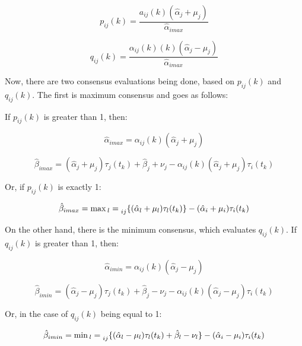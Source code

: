 \documentclass[a4paper,12pt]{article}
\begin{document}
    \begin{equation}
        p_{ij}(k) = \frac{a_{ij}(k)(\hat{\alpha}_j + \mu_j)}{\hat{\alpha}_{imax}}
    \end{equation}
    
    \begin{equation}
        q_{ij}(k) = \frac{\alpha_{ij}(k) (k) (\hat{\alpha}_j - \mu_j)}{\hat{\alpha}_{imax}}
    \end{equation}
    
    Now, there are two consensus evaluations being done, based on $p_{ij}(k)$ and $q_{ij}(k)$. The first is maximum consensus and goes as follows:
    
    If $p_{ij}(k)$ is greater than 1, then:
    
    \begin{equation}
        \hat{\alpha}_{imax} = \alpha_{ij}(k)(\hat{\alpha}_j + \mu_j)
    \end{equation}
    
    \begin{equation}
        \hat{\beta}_{imax} = (\hat{\alpha}_j + \mu_j) \tau_j(t_k) + \hat{\beta}_j + \nu_j - \alpha_{ij}(k)(\hat{\alpha}_j + \mu_j) \tau_i(t_k)
    \end{equation}
    
    Or, if $p_{ij}(k)$ is exactly 1:
    
    \begin{equation}
        \hat{\beta}_{imax} = \max{_l} = \prescript{}{ij}{\{ ( \hat{\alpha}_l + \mu_l ) \tau_l(t_k) \}} - ( \hat{\alpha}_i + \mu_i ) \tau_i(t_k)
    \end{equation}
    
    On the other hand, there is the minimum consensus, which evaluates $q_{ij}(k)$. If $q_{ij}(k)$ is greater than 1, then:
    
    \begin{equation}
        \hat{\alpha}_{imin} = \alpha_{ij}(k)(\hat{\alpha}_j - \mu_j)
    \end{equation}
    
    \begin{equation}
        \hat{\beta}_{imin} = ( \hat{\alpha}_j - \mu_j ) \tau_j(t_k) + \hat{\beta}_j - \nu_j - \alpha_{ij}(k)(\hat{\alpha}_j - \mu_j)\tau_i(t_k)
    \end{equation}
    
    Or, in the case of $q_{ij}(k)$ being equal to 1:
    
    \begin{equation}
         \hat{\beta}_{imin} = \min{_l} = \prescript{}{ij}{\{ ( \hat{\alpha}_l - \mu_l ) \tau_l(t_k) + \hat{\beta}_l - \nu_l \}} - ( \hat{\alpha}_i - \mu_i ) \tau_i(t_k) 
    \end{equation}
    
\end{document}

